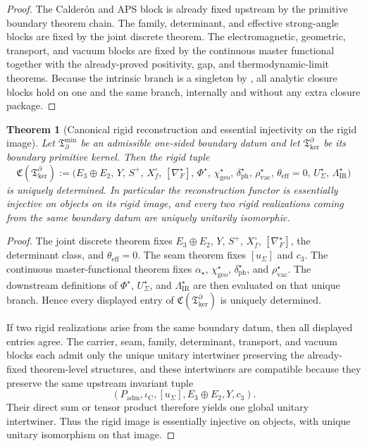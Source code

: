 \documentclass[11pt,a4paper]{article}
\newtheorem{theorem}{Theorem}[section]
\theoremstyle{definition}
\theoremstyle{remark}
\newcommand{\iC}{\iota_{\mathrm C}}
\newcommand{\cthree}{c_3}
\newcommand{\Tbound}{\mathfrak T_{\partial}^{\min}}
\newcommand{\chigeo}{\chi_{\mathrm{geo}}}
\newcommand{\Tker}{\mathfrak T_{\mathrm{ker}}}
\newcommand{\Padm}{P_{\mathrm{adm}}}
\begin{document}
\begin{proof}
The Calder\'on and APS block is already fixed upstream by the primitive boundary theorem chain.
The family, determinant, and effective strong-angle blocks are fixed by the joint discrete theorem.
The electromagnetic, geometric, transport, and vacuum blocks are fixed by the continuous master
functional together with the already-proved positivity, gap, and thermodynamic-limit theorems.
Because the intrinsic branch is a singleton by , all
analytic closure blocks hold on one and the same branch, internally and without any extra closure
package.
\end{proof}

\begin{theorem}[Canonical rigid reconstruction and essential injectivity on the rigid image]
\label{thm:rigid-reconstruction-core}
\label{thm:canonical-rigid-reconstruction-essential-injective}
Let $\Tbound$ be an admissible one-sided boundary datum and let $\Tker^\partial$ be its boundary
primitive kernel. Then the rigid tuple
\[
\mathfrak C(\Tker^\partial)
:=
\bigl(
E_3\oplus E_2,\,
Y,\,
S^+,\,
X_f^\circ,\,
[\nabla_F^\star],\,
\Phi^\star,\,
\chigeo^\star,\,
\delta_{\mathrm{ph}}^\star,\,
\rho_{\mathrm{vac}}^\star,\,
\theta_{\mathrm{eff}}=0,\,
U_\Sigma^\star,\,
\Lambda_{\mathrm{IR}}^\star
\bigr)
\]
is uniquely determined. In particular the reconstruction functor is essentially injective on
objects on its rigid image, and every two rigid realizations coming from the same boundary datum are
uniquely unitarily isomorphic.
\end{theorem}

\begin{proof}
The joint discrete theorem fixes $E_3\oplus E_2$, $Y$, $S^+$, $X_f^\circ$, $[\nabla_F^\star]$, the
determinant class, and $\theta_{\mathrm{eff}}=0$. The seam theorem fixes $[u_\Sigma]$ and
$\cthree$. The continuous master-functional theorem fixes $\alpha_\star$, $\chigeo^\star$,
$\delta_{\mathrm{ph}}^\star$, and $\rho_{\mathrm{vac}}^\star$. The downstream definitions of
$\Phi^\star$, $U_\Sigma^\star$, and $\Lambda_{\mathrm{IR}}^\star$ are then evaluated on that unique
branch. Hence every displayed entry of $\mathfrak C(\Tker^\partial)$ is uniquely determined.

If two rigid realizations arise from the same boundary datum, then all displayed entries agree. The
carrier, seam, family, determinant, transport, and vacuum blocks each admit only the unique
unitary intertwiner preserving the already-fixed theorem-level structures, and these intertwiners
are compatible because they preserve the same upstream invariant tuple
\[
(\Padm,\iC,[u_\Sigma],E_3\oplus E_2,Y,\cthree).
\]
Their direct sum or tensor product therefore yields one global unitary intertwiner. Thus the rigid
image is essentially injective on objects, with unique unitary isomorphism on that image.
\end{proof}
\end{document}
